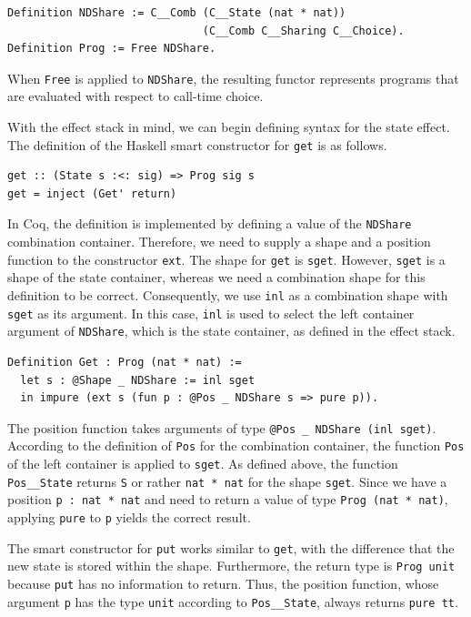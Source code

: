\documentclass[a4paper, 11pt, fleqn, twoside]{scrreprt}
\newcommand{\hinl}[1]{\texttt{#1}}
\newcommand{\cinl}[1]{\texttt{#1}}
\begin{document}
\begin{verbatim}
Definition NDShare := C__Comb (C__State (nat * nat)) 
                              (C__Comb C__Sharing C__Choice).
Definition Prog := Free NDShare.
\end{verbatim}

When \cinl{Free} is applied to \cinl{NDShare}, the resulting functor represents programs that are evaluated with respect to call-time choice.

With the effect stack in mind, we can begin defining syntax for the state effect.
The definition of the Haskell smart constructor for \hinl{get} is as follows.

\begin{verbatim}
get :: (State s :<: sig) => Prog sig s
get = inject (Get' return)
\end{verbatim}

In Coq, the definition is implemented by defining a value of the \cinl{NDShare} combination container.
Therefore, we need to supply a shape and a position function to the constructor \cinl{ext}.
The shape for \hinl{get} is \cinl{sget}.
However, \cinl{sget} is a shape of the state container, whereas we need a combination shape for this definition to be correct.
Consequently, we use \cinl{inl} as a combination shape with \cinl{sget} as its argument.
In this case, \cinl{inl} is used to select the left container argument of \cinl{NDShare}, which is the state container, as defined in the effect stack.

\begin{verbatim}
Definition Get : Prog (nat * nat) :=
  let s : @Shape _ NDShare := inl sget
  in impure (ext s (fun p : @Pos _ NDShare s => pure p)).
\end{verbatim}

The position function takes arguments of type \cinl{@Pos _ NDShare (inl sget)}.
According to the definition of \cinl{Pos} for the combination container, the function \cinl{Pos} of the left container is applied to \cinl{sget}.
As defined above, the function \cinl{Pos__State} returns \cinl{S} or rather \cinl{nat * nat} for the shape \cinl{sget}.
Since we have a position \cinl{p : nat * nat} and need to return a value of type \cinl{Prog (nat * nat)}, applying \cinl{pure} to \cinl{p} yields the correct result.

The smart constructor for \hinl{put} works similar to \hinl{get}, with the difference that the new state is stored within the shape.
Furthermore, the return type is \cinl{Prog unit} because \hinl{put} has no information to return.
Thus, the position function, whose argument \cinl{p} has the type \cinl{unit} according to \cinl{Pos__State}, always returns \cinl{pure tt}.
\end{document}
